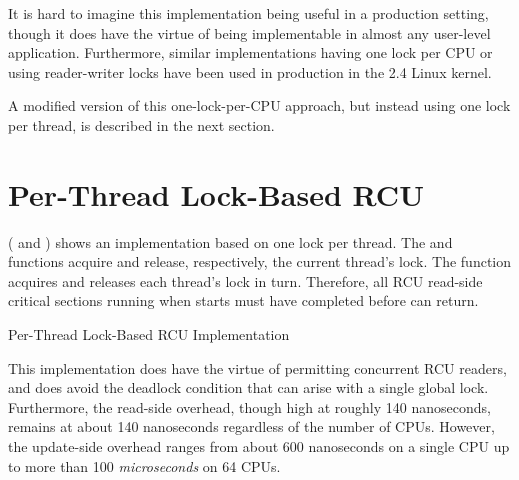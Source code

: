 It is hard to imagine this implementation being useful
in a production setting, though it does have the virtue
of being implementable in almost any user-level application.
Furthermore, similar implementations having one lock per CPU
or using reader-writer locks have been used in production
in the 2.4 Linux kernel.

A modified version of this one-lock-per-CPU approach, but instead using
one lock per thread, is described
in the next section.

\section{Per-Thread Lock-Based RCU}
\label{sec:app:toyrcu:Per-Thread Lock-Based RCU}

( and )
shows an implementation based on one lock per thread.
The  and  functions
acquire and release, respectively, the current thread's lock.
The  function acquires and releases each thread's
lock in turn.
Therefore, all RCU read-side critical sections running
when  starts must have completed before
 can return.

\begin{listing}
\vspace*{-11pt}
\caption{Per-Thread Lock-Based RCU Implementation}
\label{lst:app:toyrcu:Per-Thread Lock-Based RCU Implementation}
\end{listing}

This implementation does have the virtue of permitting concurrent
RCU readers, and does avoid the deadlock condition that can arise
with a single global lock.
Furthermore, the read-side overhead, though high at roughly 140 nanoseconds,
remains at about 140 nanoseconds regardless of the number of CPUs.
However, the update-side overhead ranges from about 600 nanoseconds
on a single  CPU
up to more than 100 \emph{microseconds} on 64 CPUs.

